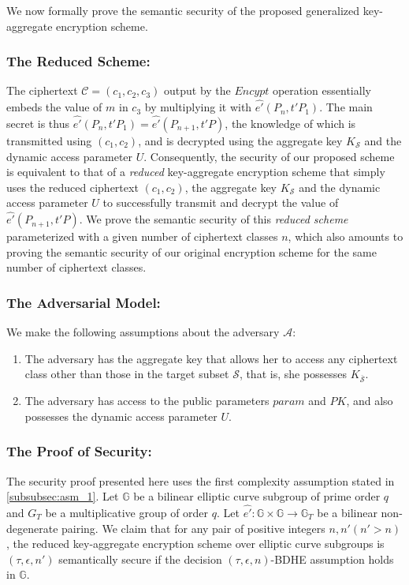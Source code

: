 We now formally prove the semantic security of the proposed generalized key-aggregate encryption scheme. 

\subsubsection{The Reduced Scheme:}

The ciphertext $\mathcal{C}=(c_1,c_2,c_3)$ output by the $Encypt$ operation essentially embeds the value of $m$ in $c_3$ by multiplying it with $\hat{e'}(P_{n},t'P_1)$. The main secret is thus $\hat{e'}(P_{n},t'P_1)=\hat{e'}(P_{n+1},t'P)$, the knowledge of which is transmitted using $(c_1,c_2)$, and is decrypted using the aggregate key $K_{\mathcal{S}}$ and the dynamic access parameter $U$. Consequently, the security of our proposed scheme is equivalent to that of a \emph{reduced} key-aggregate encryption scheme that simply uses the reduced ciphertext $(c_1,c_2)$, the aggregate key $K_{\mathcal{S}}$ and the dynamic access parameter $U$ to successfully transmit and decrypt the value of $\hat{e'}(P_{n+1},t'P)$. We prove the semantic security of this \emph{reduced scheme} parameterized with a given number of ciphertext classes $n$, which also amounts to proving the semantic security of our original encryption scheme for the same number of ciphertext classes.

\subsubsection{The Adversarial Model:} We make the following assumptions about the adversary $\mathcal{A}$:

\begin{enumerate}
 \item The adversary has the aggregate key that allows her to access any ciphertext class other than those in the target subset $\mathcal{S}$, that is, she possesses $K_{\overline{\mathcal{S}}}$.
 \item The adversary has access to the public parameters $param$ and $PK$, and also possesses the dynamic access parameter $U$.
 
\end{enumerate}

\subsubsection{The Proof of Security:}

The security proof presented here uses the first complexity assumption stated in \ref{subsubsec:asm_1}. Let $\mathbb{G}$ be a bilinear elliptic curve subgroup of prime order $q$ and $G_T$ be a multiplicative group of order $q$. Let $\hat{e'}:\mathbb{G}\times \mathbb{G}\longrightarrow\mathbb{G}_T$ be a bilinear non-degenerate pairing. We claim that for any pair of positive integers $n,n' (n'>n)$, the reduced key-aggregate encryption scheme over elliptic curve subgroups is $(\tau,\epsilon,n')$ semantically secure if the decision $(\tau,\epsilon,n)$-BDHE assumption holds in $\mathbb{G}$.

